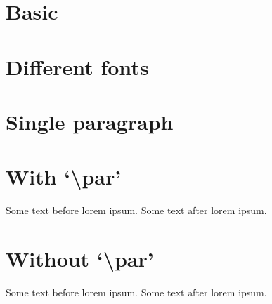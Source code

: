 \documentclass[UTF8]{ctexart}
\begin{document}
\section{Basic}
\zhlipsum

\section{Different fonts}
{\songti   \zhlipsum[1]}

{\heiti    \zhlipsum[2]}

{\fangsong \zhlipsum[3]}

{\kaishu   \zhlipsum[4]}

\section{Single paragraph}
\zhlipsum[55]

\section{With `\textbackslash par'}
Some text before lorem ipsum.
\zhlipsum[0-1]
Some text after lorem ipsum.

\section{Without `\textbackslash par'}
Some text before lorem ipsum.
\zhlipsum*[0-500]
Some text after lorem ipsum.
\end{document}
